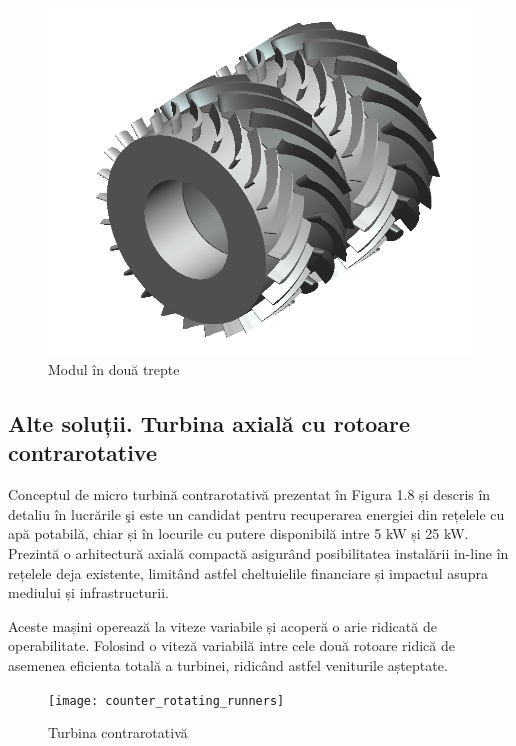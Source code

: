 \begin{figure}[h!]
	\centering
	\includegraphics[scale=0.6]{figures/modul_in_doua_trepte.png}
	\caption{Modul în două trepte \protect\cite{susanhub}}
	\label{Modul în două trepte}
\end{figure}



\subsection{Alte soluții. Turbina axială cu rotoare contrarotative}

Conceptul de micro turbină contrarotativă prezentat în Figura 1.8 și descris în detaliu în lucrările \cite{andolfatto2016simulation} \c{s}i \cite{andolfatto2015mixed} este un candidat pentru recuperarea energiei din rețelele cu apă potabilă, chiar și în locurile cu putere disponibilă intre 5 kW și 25 kW. Prezintă o arhitectură axială compactă asigurând posibilitatea instalării in-line în rețelele deja existente, limitând astfel cheltuielile financiare și impactul asupra mediului și infrastructurii.

Aceste mașini operează la viteze variabile și acoperă o arie ridicată de operabilitate. Folosind o viteză variabilă intre cele două rotoare ridică de asemenea eficienta totală a turbinei, ridicând astfel veniturile așteptate.

\begin{figure}[h!]
	\centering
	\texttt{[image: counter\_rotating\_runners]}
	\caption{Turbina contrarotativă \protect\cite{andolfatto2016simulation}}
	\label{Turbina contrarotativă}
\end{figure}

